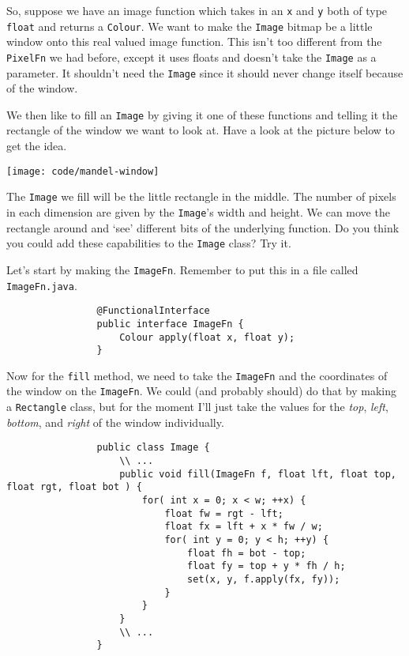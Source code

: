 \documentclass{article}
\begin{document}
            So, suppose we have an image function which takes in an \texttt{x} and \texttt{y} both of type \texttt{float} and returns a
            \texttt{Colour}. We want to make the \texttt{Image} bitmap be a little window onto this real valued image function. This isn't
            too different from the \texttt{PixelFn} we had before, except it uses floats and doesn't take the \texttt{Image} as a
            parameter. It shouldn't need the \texttt{Image} since it should never change itself because of the window.
            
            We then like to fill an \texttt{Image} by giving it one of these functions and telling it the rectangle of the window we want
            to look at.  Have a look at the picture below to get the idea.
            
            \texttt{[image: code/mandel-window]}
            
            The \texttt{Image} we fill will be the little rectangle in the middle. The number of pixels in each dimension are given by the
            \texttt{Image}'s width and height. We can move the rectangle around and `see' different bits of the underlying function.
            Do you think you could add these capabilities to the \texttt{Image} class?  Try it.
            
            
            Let's start by making the \texttt{ImageFn}.  Remember to put this in a file called \texttt{ImageFn.java}.
            
            \begin{verbatim}
                @FunctionalInterface
                public interface ImageFn {
                    Colour apply(float x, float y);
                }
            \end{verbatim}
            
            Now for the \texttt{fill} method, we need to take the \texttt{ImageFn} and the coordinates of the window on the
            \texttt{ImageFn}. We could (and probably should) do that by making a \texttt{Rectangle} class, but for the moment I'll just
            take the values for the \emph{top}, \emph{left}, \emph{bottom}, and \emph{right} of the window individually.
            
            \begin{verbatim}
                public class Image {
                    \\ ...
                    public void fill(ImageFn f, float lft, float top, float rgt, float bot ) {
                        for( int x = 0; x < w; ++x) {
                            float fw = rgt - lft;
                            float fx = lft + x * fw / w;
                            for( int y = 0; y < h; ++y) {
                                float fh = bot - top;
                                float fy = top + y * fh / h;
                                set(x, y, f.apply(fx, fy));
                            }
                        }
                    }                    
                    \\ ...
                }
            \end{verbatim}
            
\end{document}

